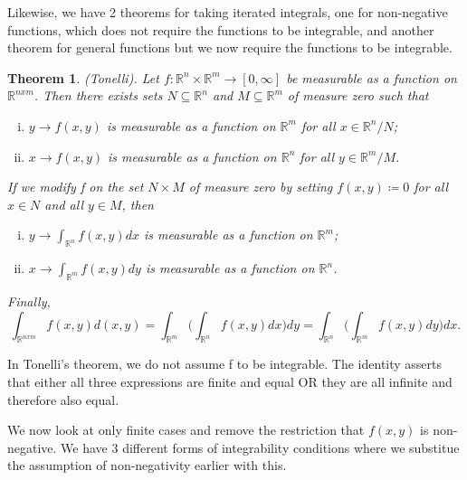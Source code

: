 \documentclass[twoside]{article}
\newcounter{lecnum}
\newtheorem{theorem}{Theorem}[lecnum]
\begin{document}
Likewise, we have 2 theorems for taking iterated integrals, one for non-negative functions, which does not require the functions to be integrable, and another theorem for general functions but we now require the functions to be integrable. 

\begin{theorem}(Tonelli). Let $f: \mathbb{R}^n \times \mathbb{R}^m \rightarrow [0, \infty]$ be measurable as a function on $\mathbb{R}^{nxm}$. Then there exists sets $N \subseteq \mathbb{R}^n$ and $M \subseteq \mathbb{R}^m$ of measure zero such that
\begin{enumerate}[(i)]
  \item $y \rightarrow f(x,y)$ is measurable as a function on $\mathbb{R}^m$ for all $x \in \mathbb{R}^n/N$;
  \item $x \rightarrow f(x,y)$ is measurable as a function on $\mathbb{R}^n$ for all $y \in \mathbb{R}^m/M$.
\end{enumerate}

If we modify f on the set $N \times M$ of measure zero by setting $f(x,y) \coloneqq 0$ for all $x \in N$ and all $y \in M$, then
\begin{enumerate}[(i)]
  \item $y \rightarrow \int_{\mathbb{R}^n}f(x,y)dx$ is measurable as a function on $\mathbb{R}^m$;
  \item $x \rightarrow \int_{\mathbb{R}^m}f(x,y)dy$ is measurable as a function on $\mathbb{R}^n$.
\end{enumerate}

Finally,
$$
\int_{\mathbb{R}^{n x m}}f(x,y)d(x,y) = \int_{\mathbb{R}^m}\big(\int_{\mathbb{R}^{n}}f(x,y)dx\big)dy = \int_{\mathbb{R}^n}\big(\int_{\mathbb{R}^{m}}f(x,y)dy\big)dx.
$$
\end{theorem}

In Tonelli's theorem, we do not assume f to be integrable. The identity asserts that either all three expressions are finite and equal OR they are all infinite and therefore also equal. 

We now look at only finite cases and remove the restriction that $f(x,y)$ is non-negative. We have 3 different forms of integrability conditions where we substitue the assumption of non-negativity earlier with this. 
\end{document}

